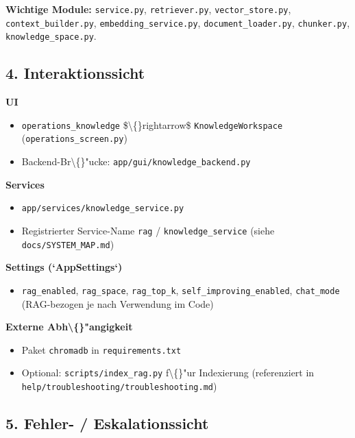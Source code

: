 \textbf{Wichtige Module:} \texttt{service.py}, \texttt{retriever.py}, \texttt{vector\_store.py}, \texttt{context\_builder.py}, \texttt{embedding\_service.py}, \texttt{document\_loader.py}, \texttt{chunker.py}, \texttt{knowledge\_space.py}.

\subsection{4. Interaktionssicht}

\textbf{UI}

\begin{itemize}
\item \texttt{operations\_knowledge} \$\textbackslash\{\}rightarrow\$ \texttt{KnowledgeWorkspace} (\texttt{operations\_screen.py})
\item Backend-Br\textbackslash\{\}"ucke: \texttt{app/gui/knowledge\_backend.py}
\end{itemize}

\textbf{Services}

\begin{itemize}
\item \texttt{app/services/knowledge\_service.py}
\item Registrierter Service-Name \texttt{rag} / \texttt{knowledge\_service} (siehe \texttt{docs/SYSTEM\_MAP.md})
\end{itemize}

\textbf{Settings (`AppSettings`)}

\begin{itemize}
\item \texttt{rag\_enabled}, \texttt{rag\_space}, \texttt{rag\_top\_k}, \texttt{self\_improving\_enabled}, \texttt{chat\_mode} (RAG-bezogen je nach Verwendung im Code)
\end{itemize}

\textbf{Externe Abh\textbackslash\{\}"angigkeit}

\begin{itemize}
\item Paket \texttt{chromadb} in \texttt{requirements.txt}
\item Optional: \texttt{scripts/index\_rag.py} f\textbackslash\{\}"ur Indexierung (referenziert in \texttt{help/troubleshooting/troubleshooting.md})
\end{itemize}

\subsection{5. Fehler- / Eskalationssicht}

